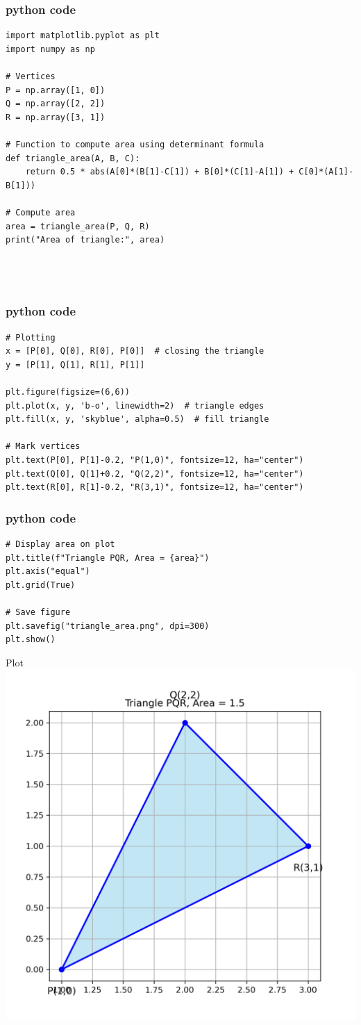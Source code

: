 \documentclass{beamer}
\begin{document}
\begin{frame}[fragile]
    \frametitle{python code }
    \begin{lstlisting}
import matplotlib.pyplot as plt
import numpy as np

# Vertices
P = np.array([1, 0])
Q = np.array([2, 2])
R = np.array([3, 1])

# Function to compute area using determinant formula
def triangle_area(A, B, C):
    return 0.5 * abs(A[0]*(B[1]-C[1]) + B[0]*(C[1]-A[1]) + C[0]*(A[1]-B[1]))

# Compute area
area = triangle_area(P, Q, R)
print("Area of triangle:", area)




    \end{lstlisting}
\end{frame}
\begin{frame}[fragile]
    \frametitle{python code }
    \begin{lstlisting}
# Plotting
x = [P[0], Q[0], R[0], P[0]]  # closing the triangle
y = [P[1], Q[1], R[1], P[1]]

plt.figure(figsize=(6,6))
plt.plot(x, y, 'b-o', linewidth=2)  # triangle edges
plt.fill(x, y, 'skyblue', alpha=0.5)  # fill triangle

# Mark vertices
plt.text(P[0], P[1]-0.2, "P(1,0)", fontsize=12, ha="center")
plt.text(Q[0], Q[1]+0.2, "Q(2,2)", fontsize=12, ha="center")
plt.text(R[0], R[1]-0.2, "R(3,1)", fontsize=12, ha="center")

\end{lstlisting}
\end{frame}
\begin{frame}[fragile]
    \frametitle{python code }
    \begin{lstlisting}
# Display area on plot
plt.title(f"Triangle PQR, Area = {area}")
plt.axis("equal")
plt.grid(True)

# Save figure
plt.savefig("triangle_area.png", dpi=300)
plt.show()
    \end{lstlisting}
\end{frame}
\begin{frame}{Plot}
    \centering
    \includegraphics[width=\columnwidth, height=0.8\textheight, keepaspectratio]{figs/triangle_area.png}     
\end{frame}
\end{document}

